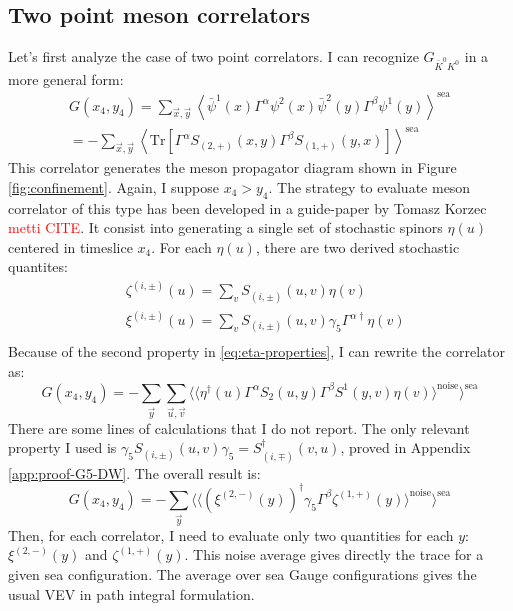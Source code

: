 \documentclass[english, LaM, oneside, noexaminfo]{sapthesis}
\newcommand{\la}{\langle}
\newcommand{\ra}{\rangle}
\newcommand{\colr}{\textcolor{red}}
\newcommand{\tr}{\text{Tr}}
\begin{document}
\subsection*{Two point meson correlators}
\noindent
Let's first analyze the case of two point correlators.
I can recognize $G_{\bar K^0 K^0}$ in a more general form:
\begin{equation}\label{eq:2pts-correlator-prototype}
    \begin{gathered}
        G(x_4,y_4) = \sum_{\vec x, \vec y} \left\la \bar\psi^1 (x) \Gamma^\alpha \psi^2 (x) \bar\psi^2 (y) \Gamma^\beta \psi^1 (y) \right\ra^\text{sea} \\
        = -  \sum_{\vec x, \vec y} \left\la \tr \left[ \Gamma^\alpha S_{(2,+)} (x,y) \Gamma^\beta S_{(1,+)} (y,x) \right] \right\ra^\text{sea}
    \end{gathered}
\end{equation}
This correlator generates the meson propagator diagram shown in Figure \ref{fig:confinement}.
Again, I suppose $x_4 > y_4$.
The strategy to evaluate meson correlator of this type has been developed in a guide-paper by Tomasz Korzec \colr{metti CITE}.
It consist into generating a single set of stochastic spinors $\eta (u)$ centered in timeslice $x_4$.
For each $\eta (u)$, there are two derived stochastic quantites:
\begin{equation*}
    \begin{split}
        & \zeta^{(i,\pm)} (u) = \sum_v S_{(i,\pm)}(u,v) \eta (v) \\
        & \xi^{(i,\pm)} (u) = \sum_v S_{(i,\pm)}(u,v) \gamma_5 \Gamma^{\alpha\dag} \eta (v) \\
    \end{split}
\end{equation*}
Because of the second property in \ref{eq:eta-properties}, I can rewrite the correlator as:
\begin{equation*}
    G(x_4,y_4) = -\sum_{\vec y} \sum_{\vec u, \vec v}  \bigg\langle \Big\langle \eta^\dag(u) \Gamma^\alpha S_2 (u,y) \Gamma^\beta S^1 (y,v) \eta(v) \Big\rangle^\text{noise} \bigg\rangle^{\text{sea}} 
\end{equation*}
There are some lines of calculations that I do not report.
The only relevant property I used is $\gamma_5 S_{(i,\pm)} (u,v) \gamma_5 = S_{(i,\mp)}^\dag (v,u)$, proved in Appendix \ref{app:proof-G5-DW}.
The overall result is:
\begin{equation*}
    G(x_4,y_4) = -\sum_{\vec y} \Bigg\langle \bigg\langle \left(\xi^{(2,-)}(y)\right)^\dag \gamma_5 \Gamma^\beta \zeta^{(1,+)}(y) \bigg\rangle^\text{noise} \Bigg\rangle^{\text{sea}} 
\end{equation*}
Then, for each correlator, I need to evaluate only two quantities for each $y$: $\xi^{(2,-)}(y)$ and $\zeta^{(1,+)}(y)$.
This noise average gives directly the trace for a given sea configuration.
The average over sea Gauge configurations gives the usual VEV in path integral formulation.
\end{document}
